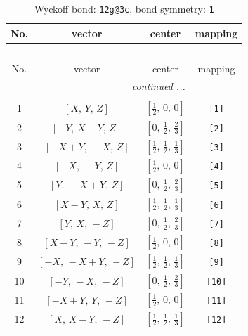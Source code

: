 \documentclass[fleqn,8pt]{jsarticle}
\begin{document}
\begin{longtable}{cccc}
\caption{Wyckoff bond: {\tt 12g@3c}, bond symmetry: {\tt 1}}
 \\
 \hline \hline
No. & vector & center & mapping \\ \hline \endfirsthead

\multicolumn{3}{l}{\tablename\ \thetable{}} \\
 \hline \hline
No. & vector & center & mapping \\ \hline \endhead

 \hline \hline
\multicolumn{3}{r}{\footnotesize\it continued ...} \\ \endfoot

 \hline \hline
\multicolumn{3}{r}{} \\ \endlastfoot

1 & $\left[ X,\, Y,\, Z \right]$ & $\left[ \frac{1}{2},\, 0,\, 0 \right]$ & {\tt [1]} \\ \hline
2 & $\left[ - Y,\, X - Y,\, Z \right]$ & $\left[ 0,\, \frac{1}{2},\, \frac{2}{3} \right]$ & {\tt [2]} \\ \hline
3 & $\left[ - X + Y,\, - X,\, Z \right]$ & $\left[ \frac{1}{2},\, \frac{1}{2},\, \frac{1}{3} \right]$ & {\tt [3]} \\ \hline
4 & $\left[ - X,\, - Y,\, Z \right]$ & $\left[ \frac{1}{2},\, 0,\, 0 \right]$ & {\tt [4]} \\ \hline
5 & $\left[ Y,\, - X + Y,\, Z \right]$ & $\left[ 0,\, \frac{1}{2},\, \frac{2}{3} \right]$ & {\tt [5]} \\ \hline
6 & $\left[ X - Y,\, X,\, Z \right]$ & $\left[ \frac{1}{2},\, \frac{1}{2},\, \frac{1}{3} \right]$ & {\tt [6]} \\ \hline
7 & $\left[ Y,\, X,\, - Z \right]$ & $\left[ 0,\, \frac{1}{2},\, \frac{2}{3} \right]$ & {\tt [7]} \\ \hline
8 & $\left[ X - Y,\, - Y,\, - Z \right]$ & $\left[ \frac{1}{2},\, 0,\, 0 \right]$ & {\tt [8]} \\ \hline
9 & $\left[ - X,\, - X + Y,\, - Z \right]$ & $\left[ \frac{1}{2},\, \frac{1}{2},\, \frac{1}{3} \right]$ & {\tt [9]} \\ \hline
10 & $\left[ - Y,\, - X,\, - Z \right]$ & $\left[ 0,\, \frac{1}{2},\, \frac{2}{3} \right]$ & {\tt [10]} \\ \hline
11 & $\left[ - X + Y,\, Y,\, - Z \right]$ & $\left[ \frac{1}{2},\, 0,\, 0 \right]$ & {\tt [11]} \\ \hline
12 & $\left[ X,\, X - Y,\, - Z \right]$ & $\left[ \frac{1}{2},\, \frac{1}{2},\, \frac{1}{3} \right]$ & {\tt [12]} \\
\end{longtable}
\end{document}
